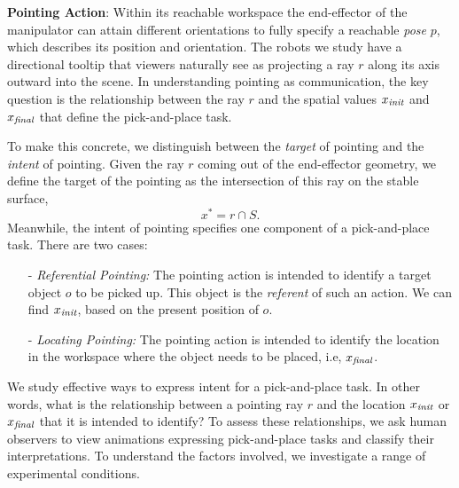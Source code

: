 \noindent\textbf{Pointing Action}: Within its reachable workspace the end-effector of the manipulator can attain different orientations to fully specify a reachable \textit{pose} $p$, which describes its position and orientation.  The robots we study have a directional tooltip that viewers naturally see as projecting a ray $r$ along its axis outward into the scene.  In understanding pointing as communication, the key question is the relationship between the ray $r$ and the spatial values $x_{\textit{init}}$ and $x_{\textit{final}}$ that define the pick-and-place task.


To make this concrete, we distinguish between the \emph{target} of pointing and the \emph{intent} of pointing. Given the ray $r$ coming out of the end-effector geometry, we define the target of the pointing as the intersection of this ray on the stable surface, $$x^*= r\cap S.$$ Meanwhile, the intent of pointing specifies one component of a pick-and-place task.  There are two cases:
\begin{itemize}
    \item [-] \textit{Referential Pointing:} The pointing action is intended to identify a target object $o$ to be picked up. This object is the \textit{referent} of such an action. We can find $x_{\textit{init}}$, based on the present position of $o$.
    \item [-] \textit{Locating Pointing:} The pointing action is intended to identify the location in the workspace where the object needs to be placed, i.e, $x_{\textit{final}}$.
\end{itemize}


We study effective ways to express intent for a pick-and-place task. In other words, what is the relationship between a pointing ray $r$ and the location $x_{\textit{init}}$ or $x_{\textit{final}}$ that it is intended to identify?  To assess these relationships, we ask human observers to view animations expressing pick-and-place tasks and classify their interpretations.  To understand the factors involved, we investigate a range of experimental conditions.
